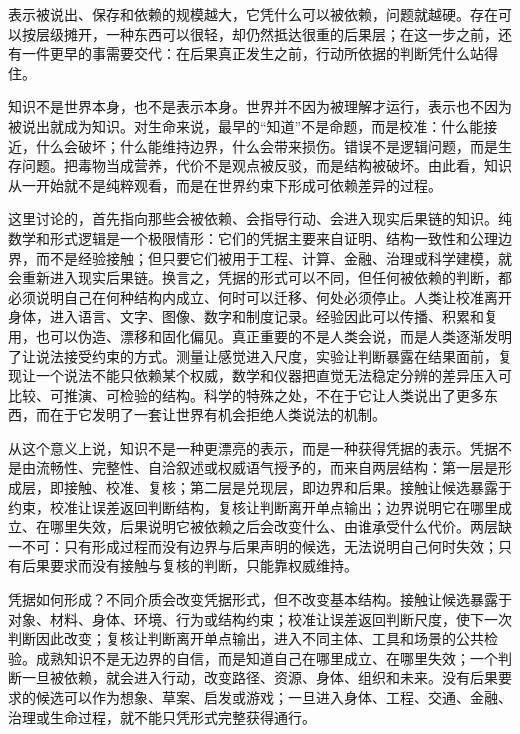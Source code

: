 表示被说出、保存和依赖的规模越大，它凭什么可以被依赖，问题就越硬。存在可以按层级摊开，一种东西可以很轻，却仍然抵达很重的后果层；在这一步之前，还有一件更早的事需要交代：在后果真正发生之前，行动所依据的判断凭什么站得住。


知识不是世界本身，也不是表示本身\cite{ogden1923meaning}。世界并不因为被理解才运行，表示也不因为被说出就成为知识。对生命来说，最早的“知道”不是命题，而是校准：什么能接近，什么会破坏；什么能维持边界，什么会带来损伤。错误不是逻辑问题，而是生存问题。把毒物当成营养，代价不是观点被反驳，而是结构被破坏。由此看，知识从一开始就不是纯粹观看，而是在世界约束下形成可依赖差异的过程。

这里讨论的，首先指向那些会被依赖、会指导行动、会进入现实后果链的知识。纯数学和形式逻辑是一个极限情形：它们的凭据主要来自证明、结构一致性和公理边界\cite{godel1931}，而不是经验接触；但只要它们被用于工程、计算、金融、治理或科学建模，就会重新进入现实后果链。换言之，凭据的形式可以不同，但任何被依赖的判断，都必须说明自己在何种结构内成立、何时可以迁移、何处必须停止。人类让校准离开身体，进入语言、文字、图像、数字和制度记录。经验因此可以传播、积累和复用，也可以伪造、漂移和固化偏见。真正重要的不是人类会说，而是人类逐渐发明了让说法接受约束的方式。测量让感觉进入尺度，实验让判断暴露在结果面前，复现让一个说法不能只依赖某个权威，数学和仪器把直觉无法稳定分辨的差异压入可比较、可推演、可检验的结构。科学的特殊之处，不在于它让人类说出了更多东西，而在于它发明了一套让世界有机会拒绝人类说法的机制\cite{popper1934logik}。


从这个意义上说，知识不是一种更漂亮的表示，而是一种获得凭据的表示\cite{gettier1963justified}。凭据不是由流畅性、完整性、自洽叙述或权威语气授予的，而来自两层结构：第一层是形成层，即接触、校准、复核；第二层是兑现层，即边界和后果。接触让候选暴露于约束，校准让误差返回判断结构，复核让判断离开单点输出；边界说明它在哪里成立、在哪里失效，后果说明它被依赖之后会改变什么、由谁承受什么代价。两层缺一不可：只有形成过程而没有边界与后果声明的候选，无法说明自己何时失效；只有后果要求而没有接触与复核的判断，只能靠权威维持。

凭据如何形成？不同介质会改变凭据形式，但不改变基本结构。接触让候选暴露于对象、材料、身体、环境、行为或结构约束；校准让误差返回判断尺度，使下一次判断因此改变；复核让判断离开单点输出，进入不同主体、工具和场景的公共检验。成熟知识不是无边界的自信，而是知道自己在哪里成立、在哪里失效；一个判断一旦被依赖，就会进入行动，改变路径、资源、身体、组织和未来。没有后果要求的候选可以作为想象、草案、启发或游戏；一旦进入身体、工程、交通、金融、治理或生命过程，就不能只凭形式完整获得通行。

